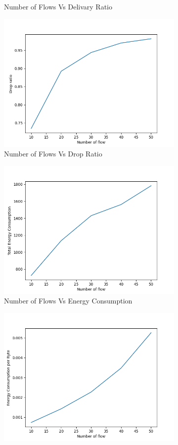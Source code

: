 \begin{figure}[h]
\begin{subfigure}{.5\textwidth}
     \caption{Number of Flows Vs Delivary Ratio}
     \label{flow_delivery_mobile}
\end{subfigure}
\begin{subfigure}{.5\textwidth}
  \centering
  \includegraphics[width=.8\linewidth]{_11_2_mobile/NumberofFlowvsDropRatio.png}
     \caption{Number of Flows Vs Drop Ratio}
     \label{flow_drop_mobile}
\end{subfigure}
\begin{subfigure}{.5\textwidth}
  \centering
  \includegraphics[width=.8\linewidth]{_11_2_mobile/NumberofFlowvsTotalEnergyConsumption.png}
     \caption{Number of Flows Vs Energy Consumption}
     \label{flow_energy_mobile}
\end{subfigure}
\begin{subfigure}{.5\textwidth}
  \centering
  \includegraphics[width=.8\linewidth]{_11_2_mobile/NumberofFlowvsEnergyConsumptionperByte.png}

\end{subfigure}
\end{figure}
